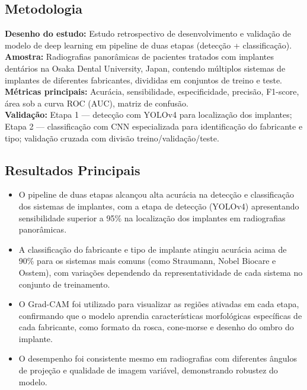 \subsection{Metodologia}
\textbf{Desenho do estudo:} Estudo retrospectivo de desenvolvimento e
validação de modelo de deep learning em pipeline de duas etapas
(detecção + classificação). \\
\textbf{Amostra:} Radiografias panorâmicas de pacientes tratados com
implantes dentários na Osaka Dental University, Japan, contendo
múltiplos sistemas de implantes de diferentes fabricantes, divididas
em conjuntos de treino e teste. \\
\textbf{Métricas principais:} Acurácia, sensibilidade, especificidade,
precisão, F1-score, área sob a curva ROC (AUC), matriz de confusão. \\
\textbf{Validação:} Etapa 1 — detecção com YOLOv4 para localização dos
implantes; Etapa 2 — classificação com CNN especializada para
identificação do fabricante e tipo; validação cruzada com divisão
treino/validação/teste.

\subsection{Resultados Principais}
\begin{itemize}
  \item O pipeline de duas etapas alcançou alta acurácia na detecção e
        classificação dos sistemas de implantes, com a etapa de detecção
        (YOLOv4) apresentando sensibilidade superior a 95\% na localização
        dos implantes em radiografias panorâmicas.
  \item A classificação do fabricante e tipo de implante atingiu acurácia
        acima de 90\% para os sistemas mais comuns (como Straumann,
        Nobel Biocare e Osstem), com variações dependendo da
        representatividade de cada sistema no conjunto de treinamento.
  \item O Grad-CAM foi utilizado para visualizar as regiões ativadas em
        cada etapa, confirmando que o modelo aprendia características
        morfológicas específicas de cada fabricante, como formato da
        rosca, cone-morse e desenho do ombro do implante.
  \item O desempenho foi consistente mesmo em radiografias com diferentes
        ângulos de projeção e qualidade de imagem variável, demonstrando
        robustez do modelo.
\end{itemize}

